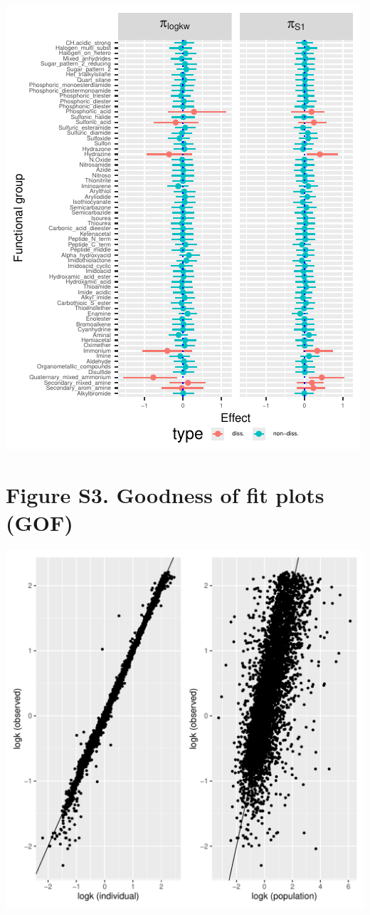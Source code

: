 \documentclass[
]{article}
\begin{document}
\includegraphics{../deliv/figures/manuscript/supplement/parameter-estimates-fg2.pdf}

\newpage{}

\hypertarget{figure-s3.-goodness-of-fit-plots-gof}{%
\section{Figure S3. Goodness of fit plots
(GOF)}\label{figure-s3.-goodness-of-fit-plots-gof}}

\includegraphics{../deliv/figures/manuscript/supplement/gof.pdf}
\end{document}
